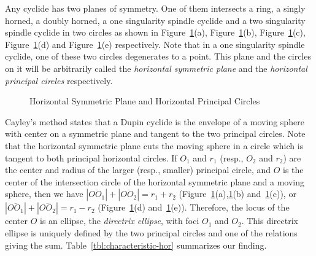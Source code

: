      Any cyclide has two planes of symmetry.  One of them intersects a ring, 
a singly horned, a doubly horned, a one singularity spindle cyclide and
a two singularity spindle cyclide in two circles as shown in 
Figure~\ref{fig:hor-circle}(a), Figure~\ref{fig:hor-circle}(b), 
Figure~\ref{fig:hor-circle}(c), Figure~\ref{fig:hor-circle}(d) and
Figure~\ref{fig:hor-circle}(e) respectively.
Note that in a one singularity spindle cyclide,
one of these two circles degenerates to a point.  This plane 
and the circles on it will be arbitrarily called the {\em horizontal symmetric
plane}
 and the 
{\em horizontal principal circles}
 respectively.
\begin{figure}
\vspace{7.5cm}
\caption{Horizontal Symmetric Plane and Horizontal Principal Circles}
\label{fig:hor-circle}
\end{figure}

     Cayley's method states that a Dupin cyclide is the envelope of a moving
sphere with center on a symmetric plane and tangent to the two principal 
circles.  Note that the horizontal symmetric plane cuts the moving sphere in 
a circle which is tangent to both principal horizontal circles.  
If $O_1$ and $r_1$ (resp., $O_2$ and $r_2$) are the center and radius of the
larger (resp., smaller) principal circle, and $O$ is the center 
of the intersection circle of the horizontal symmetric plane and a moving 
sphere, then we have
$|\overline{OO_1}|+|\overline{OO_2}|=r_1+r_2$ 
(Figure~\ref{fig:hor-circle}(a),\ref{fig:hor-circle}(b) 
and~\ref{fig:hor-circle}(c)), or 
$|\overline{OO_1}|+|\overline{OO_2}|=r_1-r_2$ 
(Figure~\ref{fig:hor-circle}(d) and~\ref{fig:hor-circle}(e)).
Therefore, the locus of the center $O$ is an ellipse, 
the {\em directrix ellipse}, with foci $O_1$ and 
$O_2$.  This directrix ellipse is uniquely defined by the two principal circles
and one of the relations giving the sum.  Table~\ref{tbl:characteristic-hor}
summarizes our finding.  

